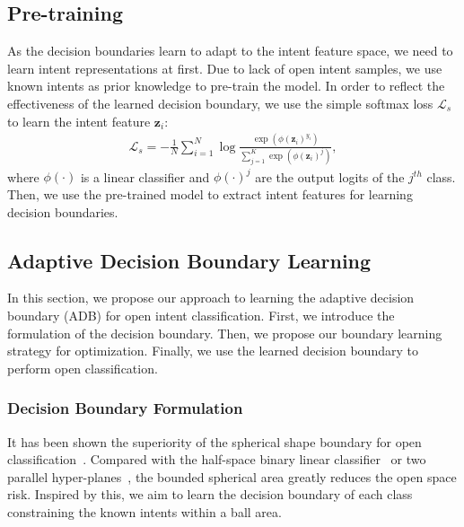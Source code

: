 \documentclass[letterpaper]{article} %
\begin{document}
\subsection{Pre-training}
As the decision boundaries learn to adapt to the intent feature space, we need to learn intent representations at first. Due to lack of open intent samples, we use known intents as prior knowledge to pre-train the model. In order to reflect the effectiveness of the learned decision boundary, we  use the simple softmax loss $\mathcal{L}_{s}$ to learn the intent feature $\boldsymbol{z}_i$:
\begin{align}
\mathcal{L}_{s}=-\frac{1}{N}\sum_{i=1}^{N} \log\frac{\exp(\phi(\boldsymbol{z}_{i})^{y_{i}})}{\sum_{j=1}^{K}\exp(\phi(\boldsymbol{z}_{i})^{j})},
\end{align}
where $\phi(\cdot)$ is a linear classifier and $\phi(\cdot)^{j}$ are the output logits of the $j^{th}$ class. Then, we use the pre-trained model to extract intent features for learning decision boundaries.

\subsection{Adaptive Decision Boundary Learning}
In this section, we propose our approach to learning the adaptive decision boundary (ADB) for open intent classification. First, we introduce the formulation of the decision boundary. Then, we propose our boundary learning strategy for optimization. Finally, we use the learned decision boundary to perform open classification.

\subsubsection{Decision Boundary Formulation}
It has been shown the superiority of the spherical shape boundary for open classification~\cite{fei-liu-2016-breaking}. Compared with the half-space binary linear classifier~\cite{scholkopf2001estimating} or two parallel hyper-planes~\cite{scheirer2013toward}, the bounded spherical area greatly reduces the open space risk. Inspired by this, we aim to learn the decision boundary of each class constraining the known intents within a ball area.
\end{document}
